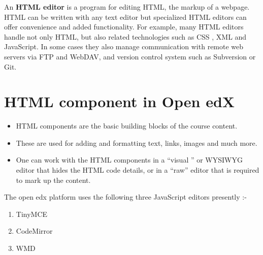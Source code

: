 An \textbf{HTML editor} is a program for editing HTML, the markup of a webpage. HTML can be written
with any text editor but specialized HTML editors can offer convenience and added functionality.
For example, many HTML editors handle not only HTML, but also related technologies such
as CSS , XML and JavaScript. In some cases they also manage communication with remote web
servers via FTP and WebDAV, and version control system such as Subversion or Git.

\section{HTML component in Open edX}
\begin{itemize}
	\item HTML components are the basic building blocks of the course content.
	\item These are used for adding and formatting text, links, images and much more.
	\item One can work with the HTML components in a “visual ” or WYSIWYG editor that hides the
HTML code details, or in a “raw” editor that is required to mark up the content.
\end{itemize}
The open edx platform uses the following three JavaScript editors presently :-
\begin{enumerate}
	\item TinyMCE
	\item CodeMirror
	\item WMD
\end{enumerate}

